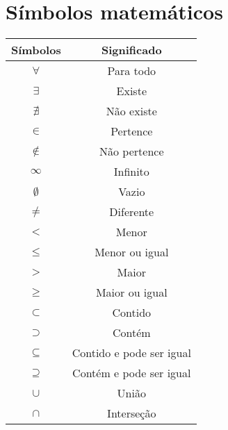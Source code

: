   \newpage
 \section{Símbolos matemáticos}
 
  \begin{table}[H]
 \centering
 \begin{tabular}{|c|c|} \hline
 \rowcolor{cinza}
 Símbolos & Significado \\\hline
 $\forall$ & Para todo \\\hline
 $\exists$ & Existe \\\hline
 $\nexists$ & Não existe \\\hline
 $\in$ & Pertence \\\hline
 $\notin$ & Não pertence \\\hline
 $\infty$ & Infinito \\\hline
 $\emptyset$ & Vazio \\\hline
 $\neq$ & Diferente \\\hline
 $<$ & Menor \\\hline
 $\leq$ & Menor ou igual \\\hline
 $>$ & Maior \\\hline
 $\geq$ & Maior ou igual \\\hline
 $\subset$ & Contido \\\hline
 $\supset$ & Contém \\\hline
 $\subseteq$ & Contido e pode ser igual \\\hline
 $\supseteq$ & Contém e pode ser igual \\\hline
 $\cup$ & União \\\hline
 $\cap$ & Interseção \\\hline
 
 \end{tabular}
 \end{table}
